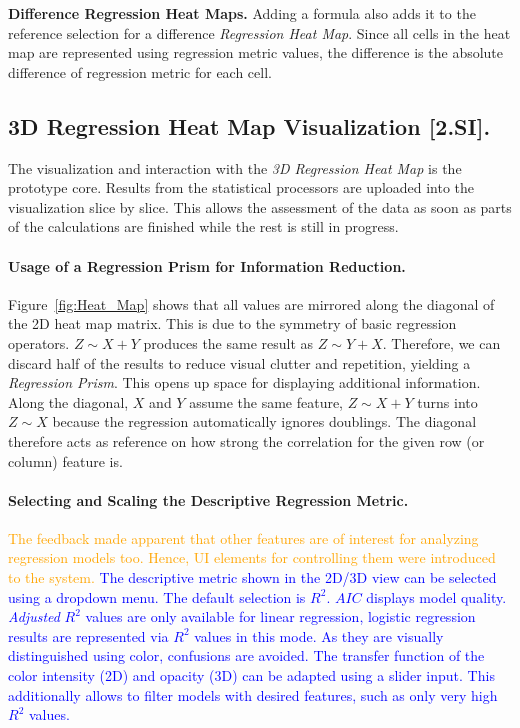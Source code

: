 \documentclass[journal]{style/vgtc} 			          %
\newcommand{\add}[1]{\textcolor{blue}{#1}}
\newcommand{\design}[1]{\textcolor{orange}{#1}}
\begin{document}
\textbf{Difference Regression Heat Maps.}
Adding a formula also adds it to the reference selection for a difference \emph{Regression Heat Map}.
Since all cells in the heat map are represented using regression metric values, the difference is the absolute difference of regression metric for each cell.
\subsection{3D Regression Heat Map Visualization [2.SI].}
The visualization and interaction with the \emph{3D Regression Heat Map} is the prototype core.
Results from the statistical processors are uploaded into the visualization slice by slice.
This allows the assessment of the data as soon as parts of the calculations are finished while the rest is still in progress.

\paragraph{Usage of a Regression Prism for Information Reduction.}
Figure~\ref{fig:Heat_Map} shows that all values are mirrored along the diagonal of the 2D heat map matrix.
This is due to the symmetry of basic regression operators.
$Z \sim X + Y$ produces the same result as $Z \sim Y + X$.
Therefore, we can discard half of the results to reduce visual clutter and repetition, yielding a \emph{Regression Prism}.
This opens up space for displaying additional information.
Along the diagonal, $X$ and $Y$ assume the same feature, $Z \sim X + Y$ turns into $Z \sim X$ because the regression automatically ignores doublings.
The diagonal therefore acts as reference on how strong the correlation for the given row (or column) feature is.

\paragraph{Selecting and Scaling the Descriptive Regression Metric.}
\design{
The feedback made apparent that other features are of interest for analyzing regression models too.
Hence, UI elements for controlling them were introduced to the system.
}
\add{
The descriptive metric shown in the 2D/3D view can be selected using a dropdown menu.
The default selection is $R^2$.
$AIC$ displays model quality.
\emph{Adjusted} $R^2$ values are only available for linear regression, logistic regression results are represented via $R^2$ values in this mode.
As they are visually distinguished using color, confusions are avoided.
The transfer function of the color intensity (2D) and opacity (3D) can be adapted using a slider input.
This additionally allows to filter models with desired features, such as only very high $R^2$ values.
}
\end{document}
